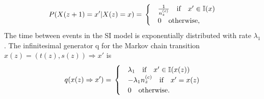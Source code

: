 \documentclass[12pt]{article} %
\numberwithin{equation}{section}
\begin{document}
\begin{equation} \label{firstP}
P(X(z+1) = x' |X(z)= x) = \\
\begin{cases}
& \frac{1}{n_z^{(c)}}  \quad \text{if} \quad x' \in \mathbb{I}(x) \\
& 0 \quad \text{otherwise,}
\end{cases}
\end{equation}
The time between events in the SI model is exponentially distributed with rate $\lambda_1$. The infinitesimal generator q for the Markov chain transition $x(z) = (t(z),s(z)) \Rightarrow x'$ is
\begin{equation}\label{trans1}
q(x(z) \Rightarrow x') = \\
\begin{cases}
& \lambda_1   \quad \text{if} \quad x' \in \mathbb{I}(x(z)) \\ 
& -\lambda_1 n_z^{(c)} \quad \text{if} \quad x' = x(z)\\
& 0 \quad \text{otherwise.}
\end{cases}
\end{equation}
\end{document}
